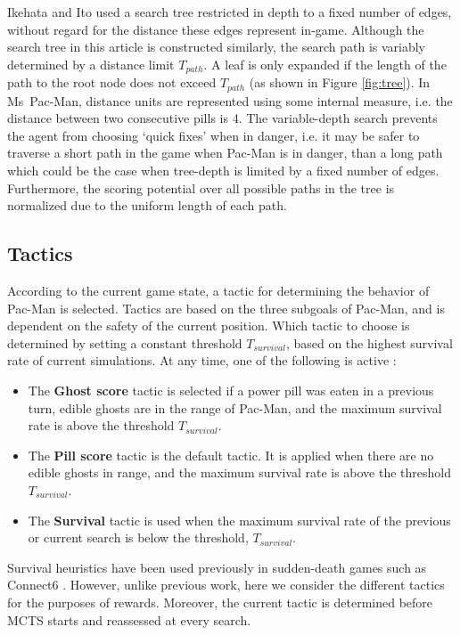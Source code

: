 \documentclass[journal]{IEEEtran}
\begin{document}
Ikehata and Ito \cite{ikehata2011monte} used a search tree restricted in depth to a fixed number of edges, without regard for the distance these edges represent in-game. Although the search tree in this article is constructed similarly, the search path is variably determined by a distance limit $T_{path}$. A leaf is only expanded if the length of the path to the root node does not exceed $T_{path}$ (as shown in Figure \ref{fig:tree}). In Ms~Pac-Man, distance units are represented using some internal measure, i.e. the distance between two consecutive pills is $4$. The variable-depth search prevents the agent from choosing `quick fixes' when in danger, i.e. it may be safer to traverse a short path in the game when Pac-Man is in danger, than a long path which could be the case when tree-depth is limited by a fixed number of edges. Furthermore, the scoring potential over all possible paths in the tree is normalized due to the uniform length of each path.

\subsection{Tactics}
\label{Strategy}
According to the current game state, a tactic \cite{ikehata2011monte} for determining the behavior of Pac-Man is selected. Tactics are based on the three subgoals of Pac-Man, and is dependent on the safety of the current position. Which tactic to choose is determined by setting a constant threshold $T_{survival}$, based on the highest survival rate of current simulations. At any time, one of the following is active \cite{ikehata2011monte}:
\begin{itemize}
\item The {\bf Ghost score} tactic is selected if a power pill was eaten in a previous turn, edible ghosts are in the range of Pac-Man, and the maximum survival rate is above the threshold $T_{survival}$.
\item The {\bf Pill score} tactic is the default tactic. It is applied when there are no edible ghosts in range, and the maximum survival rate is above the threshold $T_{survival}$.
\item The {\bf Survival} tactic is used when the maximum survival rate of the previous or current search is below the threshold, $T_{survival}$.
\end{itemize}

Survival heuristics have been used previously in sudden-death games such as Connect6 \cite{yen2011two}. However, unlike previous work, here we consider the different tactics for the purposes of rewards. Moreover, the current tactic is determined before MCTS starts and reassessed at every search. 
\end{document}
